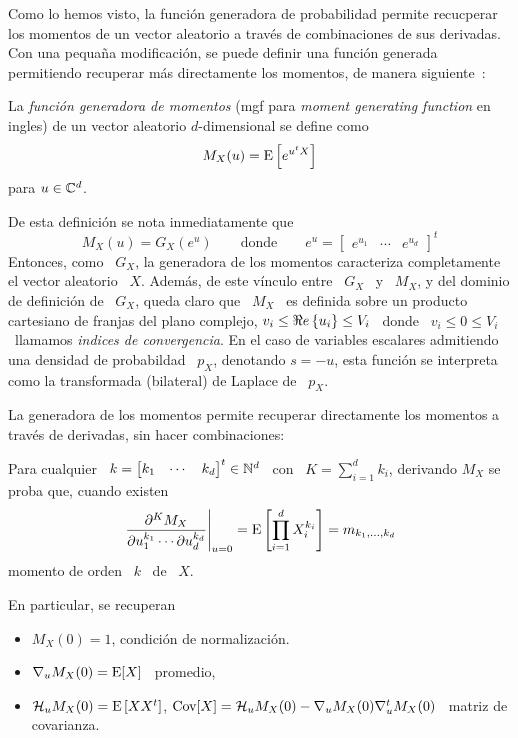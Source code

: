 
\label{Ssec:MP:GeneradoraMomentos}


Como lo hemos visto, la  funci\'on generadora de probabilidad permite recucperar
los  momentos  de  un  vector  aleatorio  a trav\'es  de  combinaciones  de  sus
derivadas.   Con una pequa\~na  modificaci\'on, se  puede definir  una funci\'on
generada  permitiendo  recuperar  m\'as  directamente los  momentos,  de  manera
siguiente~\cite{Fel68, JohKot97, Muk00, AthLah06}:
%
\begin{definicion}
\label{Def:MP:GeneradoraMomentos}
%
  La {\em  funci\'on generadora  de momentos} (mgf  para {\em  moment generating
    function} en ingles) de un vector aleatorio $d$-dimensional se define como
  \[
  M_X(u) = \operatorname{E}\left[ e^{u^t X} \right]
  \]
  para $u \in \mathbb{C}^d$.
\end{definicion}
%
De esta definici\'on se nota inmediatamente que
%
\[
M_X(u) = G_X\left( e^u \right)  \qquad \mbox{donde} \qquad e^u = \begin{bmatrix}
  e^{u_1} & \cdots & e^{u_d} \end{bmatrix}^t
\]
%
Entonces, como \ $G_X$, la  generadora de los momentos caracteriza completamente
el vector  aleatorio \ $X$.   Adem\'as, de  este v\'inculo entre  \ $G_X$ \  y \
$M_X$, y del  dominio de definici\'on de \  $G_X$, queda claro que \  $M_X$ \ es
definida sobre un  producto cartesiano de franjas del plano  complejo, $ v_i \le
\Re e \left\{ u_i \right\} \le  V_i$ \ donde \  $v_i \le 0 \le  V_i$ \ llamamos  {\em indices de
  convergencia}.  En el  caso de variables escalares admitiendo  una densidad de
probabildad \  $p_X$, denotando $s =  -u$, esta funci\'on se  interpreta como la
transformada (bilateral) de Laplace de \ $p_X$.


La  generadora de  los momentos  permite recuperar  directamente los  momentos a
trav\'es de derivadas, sin hacer combinaciones:
%
\begin{lema}
\label{Lem:MP:GenracionMomentos}
%
  Para cualquier \  $k = \begin{bmatrix} k_1 & \cdots  & k_d \end{bmatrix}^t \in
  \mathbb{N}^d$ \ con \ $K =  \sum_{i=1}^d k_i$, derivando $M_X$ se proba que, cuando
  existen
  \[
  \left.\frac{\partial^K     M_X}{\partial     u_1^{k_1}     \cdots     \partial
      u_d^{k_d}}\right|_{u=0}  = \operatorname{E}\left[  \prod_{i=1}^d  X_i^{k_i} \right]  =
  m_{k_1,\ldots,k_d}
  \]
  momento de orden \ $k$ \ de \ $X$.
\end{lema}
%
En particular, se recuperan
%
\begin{itemize}
\item $M_X(0) = 1$, condici\'on de normalizaci\'on.
%
\item $\nabla_u M_X(0) = \operatorname{E}[X]$ \ promedio,
%
\item $\mathcal{H}_u M_X(0) = \operatorname{E}\left[ X X^t \right]$, \ie $\operatorname{Cov}[X] = \mathcal{H}_u M_X(0)
  - \nabla_u M_X(0) \nabla_u^t M_X(0)$ \ matriz de covarianza.
\end{itemize}

